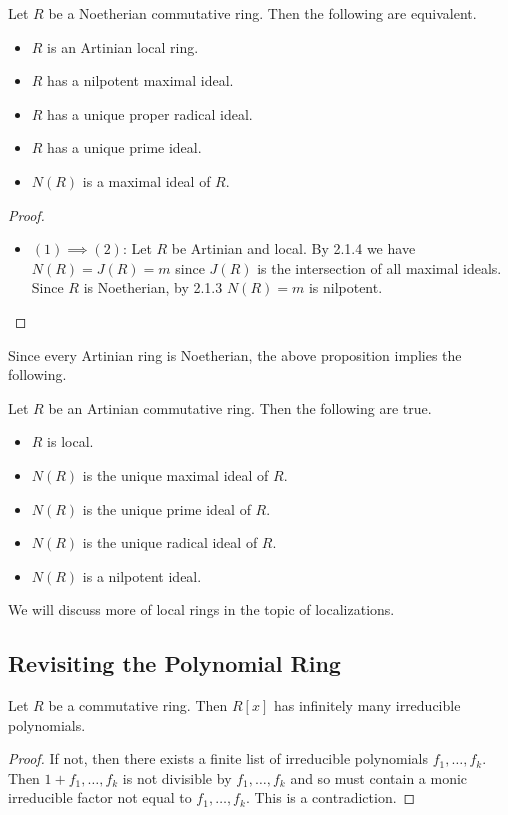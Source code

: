 \documentclass[a4paper]{article}
\begin{document}
\begin{prp}{}{} Let $R$ be a Noetherian commutative ring. Then the following are equivalent. 
\begin{itemize}
\item $R$ is an Artinian local ring. 
\item $R$ has a nilpotent maximal ideal. 
\item $R$ has a unique proper radical ideal. 
\item $R$ has a unique prime ideal. 
\item $N(R)$ is a maximal ideal of $R$. 
\end{itemize} \tcbline
\begin{proof}~\\
\begin{itemize}
\item $(1)\implies(2)$: Let $R$ be Artinian and local. By 2.1.4 we have $N(R)=J(R)=m$ since $J(R)$ is the intersection of all maximal ideals. Since $R$ is Noetherian, by 2.1.3 $N(R)=m$ is nilpotent. 
\end{itemize}
\end{proof}
\end{prp}

Since every Artinian ring is Noetherian, the above proposition implies the following. 

\begin{crl}{}{} Let $R$ be an Artinian commutative ring. Then the following are true. 
\begin{itemize}
\item $R$ is local. 
\item $N(R)$ is the unique maximal ideal of $R$. 
\item $N(R)$ is the unique prime ideal of $R$. 
\item $N(R)$ is the unique radical ideal of $R$. 
\item $N(R)$ is a nilpotent ideal. 
\end{itemize}
\end{crl}

We will discuss more of local rings in the topic of localizations. 

\subsection{Revisiting the Polynomial Ring}
\begin{lmm}{}{} Let $R$ be a commutative ring. Then $R[x]$ has infinitely many irreducible polynomials. \tcbline
\begin{proof}
If not, then there exists a finite list of irreducible polynomials $f_1,\dots,f_k$. Then $1+f_1,\dots,f_k$ is not divisible by $f_1,\dots,f_k$ and so must contain a monic irreducible factor not equal to $f_1,\dots,f_k$. This is a contradiction. 
\end{proof}
\end{lmm}
\end{document}
